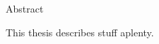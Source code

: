 \documentclass[../thesis-main.tex]{subfiles}
\begin{document}
 {
 \Large
 \noindent\makebox[3in][l]{\xauthor}\hfill{} \vskip 1pt
 \makebox[3in][l]{\xcollege}\hfill\makebox[3in][r]{\xterm}
 }
 
 \vskip 1cm
 
 {
 \LARGE \bf
 \begin{center}
 {\xtitle}
 \end{center}
 }
 
 {
 \large\bf
 \begin{center}
 Abstract
 \end{center}
 }
 
 \setlength{\baselineskip}{16truept}
 
 This thesis describes stuff aplenty.
\end{document}
